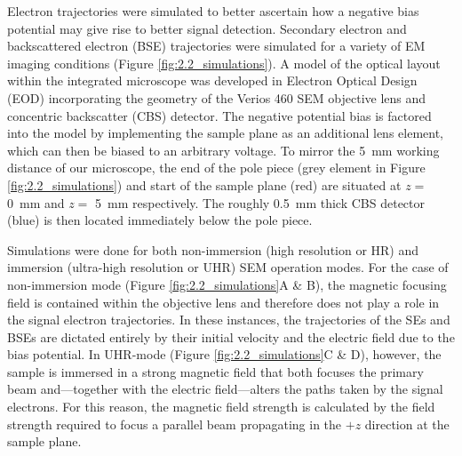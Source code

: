 Electron trajectories were simulated to better ascertain how a negative bias potential may give rise to better signal detection. Secondary electron and backscattered electron (BSE) trajectories were simulated for a variety of EM imaging conditions (Figure \ref{fig:2.2_simulations}). A model of the optical layout within the integrated microscope was developed in Electron Optical Design (EOD) \cite{lencova2008new} incorporating the geometry of the Verios 460 SEM objective lens and concentric backscatter (CBS) detector. The negative potential bias is factored into the model by implementing the sample plane as an additional lens element, which can then be biased to an arbitrary voltage. To mirror the \SI{5}{\milli\meter} working distance of our microscope, the end of the pole piece (grey element in Figure \ref{fig:2.2_simulations}) and start of the sample plane (red) are situated at $z=$ \SI{0}{\milli\meter} and $z=$ \SI{5}{\milli\meter} respectively. The roughly \SI{0.5}{\milli\meter} thick CBS detector (blue) is then located immediately below the pole piece.

Simulations were done for both non-immersion (high resolution or HR) and immersion (ultra-high resolution or UHR) SEM operation modes. For the case of non-immersion mode (Figure \ref{fig:2.2_simulations}A \& B), the magnetic focusing field is contained within the objective lens and therefore does not play a role in the signal electron trajectories. In these instances, the trajectories of the SEs and BSEs are dictated entirely by their initial velocity and the electric field due to the bias potential. In UHR-mode (Figure \ref{fig:2.2_simulations}C \& D), however, the sample is immersed in a strong magnetic field that both focuses the primary beam and---together with the electric field---alters the paths taken by the signal electrons. For this reason, the magnetic field strength is calculated by the field strength required to focus a parallel beam propagating in the $+z$ direction at the sample plane.

